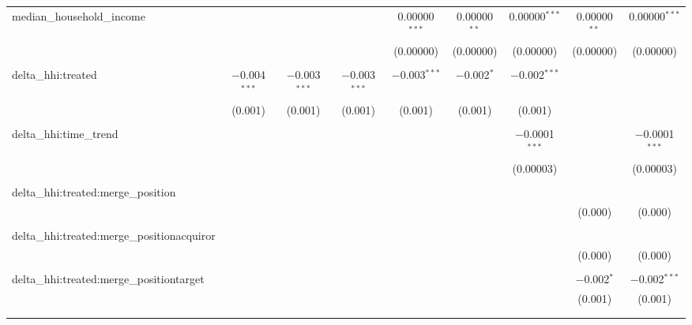 \begin{table}[H]
{\begin{tabular}{@{\extracolsep{5pt}}lcccccccc}
  median\_household\_income &  &  &  & 0.00000$^{***}$ & 0.00000$^{**}$ & 0.00000$^{***}$ & 0.00000$^{**}$ & 0.00000$^{***}$ \\  

   &  &  &  & (0.00000) & (0.00000) & (0.00000) & (0.00000) & (0.00000) \\  

   & & & & & & & & \\  

  delta\_hhi:treated & $-$0.004$^{***}$ & $-$0.003$^{***}$ & $-$0.003$^{***}$ & $-$0.003$^{***}$ & $-$0.002$^{*}$ & $-$0.002$^{***}$ &  &  \\  

   & (0.001) & (0.001) & (0.001) & (0.001) & (0.001) & (0.001) &  &  \\  

   & & & & & & & & \\  

  delta\_hhi:time\_trend &  &  &  &  &  & $-$0.0001$^{***}$ &  & $-$0.0001$^{***}$ \\  

   &  &  &  &  &  & (0.00003) &  & (0.00003) \\  

   & & & & & & & & \\  

  delta\_hhi:treated:merge\_position &  &  &  &  &  &  &  &  \\  

   &  &  &  &  &  &  & (0.000) & (0.000) \\  

   & & & & & & & & \\  

  delta\_hhi:treated:merge\_positionacquiror &  &  &  &  &  &  &  &  \\  

   &  &  &  &  &  &  & (0.000) & (0.000) \\  

   & & & & & & & & \\  

  delta\_hhi:treated:merge\_positiontarget &  &  &  &  &  &  & $-$0.002$^{*}$ & $-$0.002$^{***}$ \\  

   &  &  &  &  &  &  & (0.001) & (0.001) \\  

   & & & & & & & & \\  

 \hline \\[-1.8ex]  


\end{tabular}}
\end{table}
